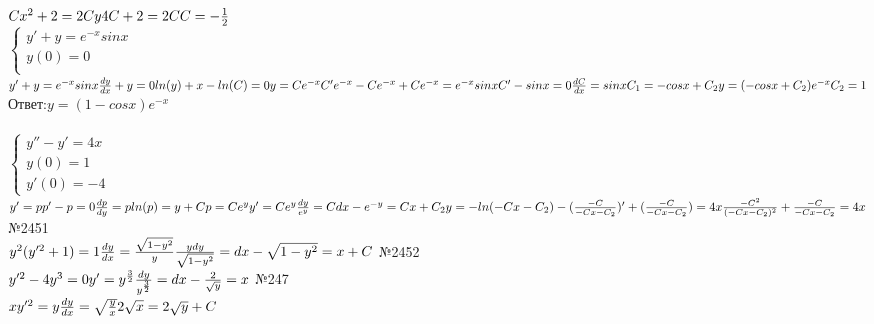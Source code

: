 \documentclass[a4paper]{article}
\begin{document}
    $Cx^2+2=2Cy\\
    4C+2=2C\\
    C=-\frac{1}{2}\\$\\
    $\begin{cases}
        y'+y=e^{-x}sinx\\
        y(0)=0\\
    \end{cases}$\\
    $y'+y=e^{-x}sinx\\
    \frac{dy}{dx}+y=0\\
    ln(y)+x-ln(C)=0\\
    y=Ce^{-x}\\
    C'e^{-x}-Ce^{-x}+Ce^{-x}=e^{-x}sinx\\
    C'-sinx=0\\
    \frac{dC}{dx}=sinx\\
    C_1=-cosx+C_2\\
    y=(-cosx+C_2)e^{-x}\\
    C_2=1\\$
    Ответ:$y=(1-cosx)e^{-x}$\\\\
    $\begin{cases}
        y''-y'=4x\\
        y(0)=1\\
        y'(0)=-4
    \end{cases}$\\
    $y'=p\\
    p'-p=0\\
    \frac{dp}{dy}=p\\
    ln(p)=y+C\\
    p=Ce^{y}\\
    y'=Ce^y\\
    \frac{dy}{e^y}=Cdx\\
    -e^{-y}=Cx+C_2\\
    y=-ln(-Cx-C_2)\\
    -(\frac{-C}{-Cx-C_2})'+(\frac{-C}{-Cx-C_2})=4x\\
    \frac{-C^2}{(-Cx-C_2)^2}+\frac{-C}{-Cx-C_2}=4x$
    \newpage
    №2451\\
    $y^2(y'^2+1)=1\\
    \frac{dy}{dx}=\frac{\sqrt{1-y^2}}{y}\\
    \frac{ydy}{\sqrt{1-y^2}}=dx\\
    -\sqrt{1-y^2}=x+C\\$
    №2452\\
    $y'^2-4y^3=0\\
    y'=y^\frac{3}{2}\\
    \frac{dy}{y^\frac{3}{2}}=dx\\
    -\frac{2}{\sqrt{y}}=x\\$
    №247\\
    $xy'^2=y\\
    \frac{dy}{dx}=\sqrt{\frac{y}{x}}\\
    2\sqrt{x}=2\sqrt{y}+C$
\end{document}
